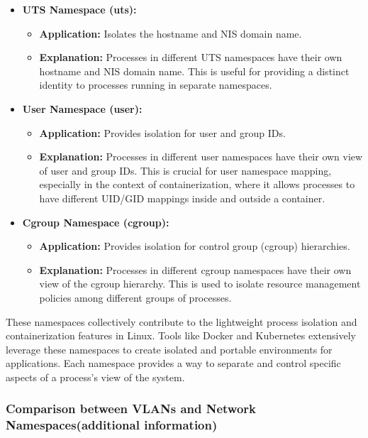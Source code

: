 \documentclass{report}
\begin{document}
\begin{itemize}
  \item \textbf{UTS Namespace (uts):}
    \begin{itemize}
      \item \textbf{Application:} Isolates the hostname and NIS domain name.
      \item \textbf{Explanation:} Processes in different UTS namespaces have their own hostname and NIS domain name. This is useful for providing a distinct identity to processes running in separate namespaces.
    \end{itemize}

  \item \textbf{User Namespace (user):}
    \begin{itemize}
      \item \textbf{Application:} Provides isolation for user and group IDs.
      \item \textbf{Explanation:} Processes in different user namespaces have their own view of user and group IDs. This is crucial for user namespace mapping, especially in the context of containerization, where it allows processes to have different UID/GID mappings inside and outside a container.
    \end{itemize}

  \item \textbf{Cgroup Namespace (cgroup):}
    \begin{itemize}
      \item \textbf{Application:} Provides isolation for control group (cgroup) hierarchies.
      \item \textbf{Explanation:} Processes in different cgroup namespaces have their own view of the cgroup hierarchy. This is used to isolate resource management policies among different groups of processes.
    \end{itemize}

\end{itemize}

These namespaces collectively contribute to the lightweight process isolation and containerization features in Linux. 
Tools like Docker and Kubernetes extensively leverage these namespaces to create isolated and portable environments for applications.
Each namespace provides a way to separate and control specific aspects of a process's view of the system.\cite{8}

\subsubsection*{Comparison between VLANs and Network Namespaces(additional information)}
\end{document}
